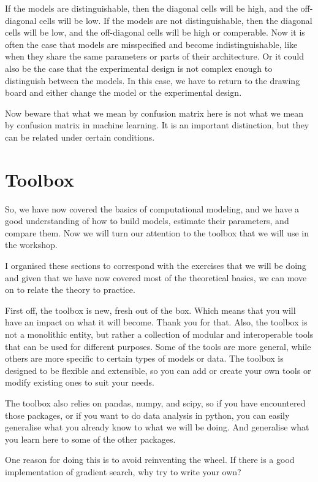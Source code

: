\documentclass[12pt]{article}
\begin{document}
If the models are distinguishable, then the diagonal cells will be high, and the off-diagonal cells will be low. If the models are not distinguishable, then the diagonal cells will be low, and the off-diagonal cells will be high or comperable. Now it is often the case that models are misspecified and become indistinguishable, like when they share the same parameters or parts of their architecture. Or it could also be the case that the experimental design is not complex enough to distinguish between the models. In this case, we have to return to the drawing board and either change the model or the experimental design.

Now beware that what we mean by confusion matrix here is not what we mean by confusion matrix in machine learning. It is an important distinction, but they can be related under certain conditions.


\section{Toolbox}

So, we have now covered the basics of computational modeling, and we have a good understanding of how to build models, estimate their parameters, and compare them. Now we will turn our attention to the toolbox that we will use in the workshop.

I organised these sections to correspond with the exercises that we will be doing and given that we have now covered most of the theoretical basics, we can move on to relate the theory to practice.

First off, the toolbox is new, fresh out of the box. Which means that you will have an impact on what it will become. Thank you for that. Also, the toolbox is not a monolithic entity, but rather a collection of modular and interoperable tools that can be used for different purposes. Some of the tools are more general, while others are more specific to certain types of models or data. The toolbox is designed to be flexible and extensible, so you can add or create your own tools or modify existing ones to suit your needs.

The toolbox also relies on pandas, numpy, and scipy, so if you have encountered those packages, or if you want to do data analysis in python, you can easily generalise what you already know to what we will be doing. And generalise what you learn here to some of the other packages.

One reason for doing this is to avoid reinventing the wheel. If there is a good implementation of gradient search, why try to  write your own? 
\end{document}

